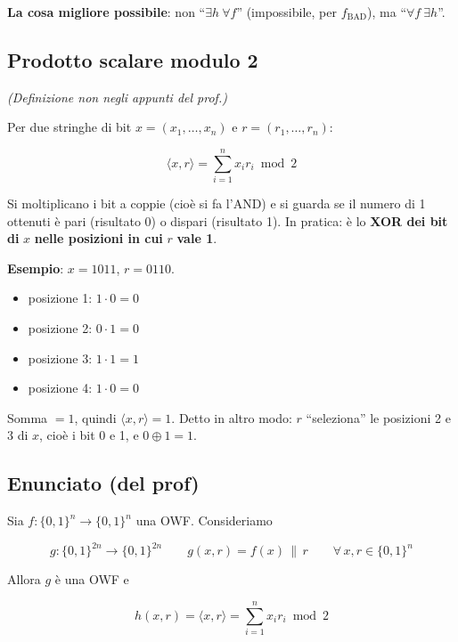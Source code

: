 \textbf{La cosa migliore possibile}: non ``\(\exists h\ \forall f\)'' (impossibile, per \(f_{\text{BAD}}\)), ma ``\(\forall f\ \exists h\)''.

\subsection{Prodotto scalare modulo 2}

\emph{(Definizione non negli appunti del prof.)}

Per due stringhe di bit \(x = (x_1, \dots, x_n)\) e \(r = (r_1, \dots, r_n)\):

\[
\langle x, r \rangle = \sum_{i=1}^{n} x_i r_i \bmod 2
\]

Si moltiplicano i bit a coppie (cioè si fa l'AND) e si guarda se il numero di 1 ottenuti è pari (risultato 0) o dispari (risultato 1). In pratica: è lo \textbf{XOR dei bit di} \(x\) \textbf{nelle posizioni in cui} \(r\) \textbf{vale 1}.

\begin{esempio}

\textbf{Esempio}: \(x = 1011\), \(r = 0110\).

\begin{itemize}
\tightlist
\item
  posizione 1: \(1 \cdot 0 = 0\)
\item
  posizione 2: \(0 \cdot 1 = 0\)
\item
  posizione 3: \(1 \cdot 1 = 1\)
\item
  posizione 4: \(1 \cdot 0 = 0\)
\end{itemize}

Somma \(= 1\), quindi \(\langle x, r \rangle = 1\). Detto in altro modo: \(r\) ``seleziona'' le posizioni 2 e 3 di \(x\), cioè i bit 0 e 1, e \(0 \oplus 1 = 1\).

\end{esempio}

\subsection{Enunciato (del prof)}

Sia \(f : \{0,1\}^n \to \{0,1\}^n\) una OWF. Consideriamo

\[
g : \{0,1\}^{2n} \to \{0,1\}^{2n} \qquad g(x, r) = f(x) \,\|\, r \qquad \forall\, x, r \in \{0,1\}^n
\]

Allora \(g\) è una OWF e

\[
h(x, r) = \langle x, r \rangle = \sum_{i=1}^{n} x_i r_i \bmod 2
\]

